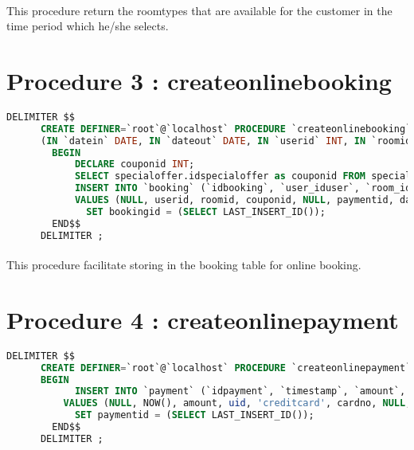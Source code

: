       \paragraph{}
        This procedure return the roomtypes that are available for the customer in the time period which he/she selects.

    \section{Procedure 3 : createonlinebooking}
      \ttfamily
      \begin{lstlisting}[language=SQL]
      DELIMITER $$
      CREATE DEFINER=`root`@`localhost` PROCEDURE `createonlinebooking`
      (IN `datein` DATE, IN `dateout` DATE, IN `userid` INT, IN `roomid` INT, IN `coupon` VARCHAR(50), IN `paymentid` INT, OUT `bookingid` INT)
        BEGIN
          	DECLARE couponid INT;
          	SELECT specialoffer.idspecialoffer as couponid FROM specialoffer WHERE specialoffer.code = coupon;
          	INSERT INTO `booking` (`idbooking`, `user_iduser`, `room_idroom`, `specialoffer_idspecialoffer`, `staff_idstaff`, `payment_idpayment`, `fromdate`, `todate`, `status`)
            VALUES (NULL, userid, roomid, couponid, NULL, paymentid, datein, dateout, 'unchecked');
              SET bookingid = (SELECT LAST_INSERT_ID());
        END$$
      DELIMITER ;
      \end{lstlisting}
      \rmfamily
      \paragraph{}
        This procedure facilitate storing in the booking table for online booking.

    \section{Procedure 4 : createonlinepayment}
    \ttfamily
      \begin{lstlisting}[language=SQL]
      DELIMITER $$
      CREATE DEFINER=`root`@`localhost` PROCEDURE `createonlinepayment`(IN `amount` DECIMAL(10,2), IN `uid` INT, IN `cardno` VARCHAR(50), OUT `paymentid` INT)
      BEGIN
        	INSERT INTO `payment` (`idpayment`, `timestamp`, `amount`, `user_iduser`, `method`, `cardno`, `staff_idstaff`,`type`)
          VALUES (NULL, NOW(), amount, uid, 'creditcard', cardno, NULL,'booking');
            SET paymentid = (SELECT LAST_INSERT_ID());
        END$$
      DELIMITER ;
      \end{lstlisting}
      \rmfamily
